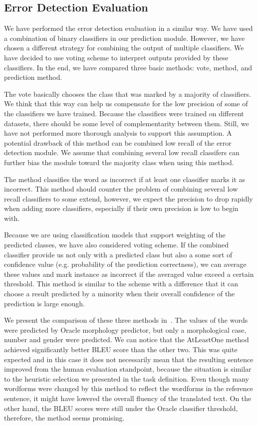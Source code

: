 \subsection{Error Detection Evaluation}

We have performed the error detection evaluation in a similar way. We have used a combination
of binary classifiers in our prediction module. However, we have chosen a different strategy
for combining the output of multiple classifiers.
We have decided to use voting scheme to interpret outputs provided by these classifiers.
In the end, we have compared three basic methods:  vote,  method,
and  prediction method.

The  vote basically chooses the class that was marked by a majority of classifiers.
We think that this way can help us compensate for the low precision of some of the classifiers we have trained.
Because the classifiers were trained on different datasets, there should be some level of complementarity
between them. Still, we have not performed more thorough analysis to support this assumption.
A potential drawback of this method can be combined low recall of the error detection module. We assume that
combining several low recall classifers can further bias the module toward the majority class when using
this method.

The  method classifies the word as incorrect if at least one classifier marks it
as incorrect. This method should counter the problem of combining several low recall classifiers to some
extend, however, we expect the precision to drop rapidly when adding more classifiers, especially if their own
precision is low to begin with.

Because we are using classification models that support weighting of the predicted classes, we have
also considered  voting scheme. If the combined classifier provide us not only with
a predicted class but also a some sort of confidence value (e.g. probability of the prediction correctness),
we can average these values and mark instance as incorrect if the averaged value exceed a certain threshold.
This method is similar to the  scheme with a difference that it can choose a result
predicted by a minority when their overall confidence of the prediction is large enough.

We present the comparison of these three methods in~. The values of the 
words were predicted by Oracle morphology predictor, but only a morphological case, number and gender were predicted.
We can notice that the AtLeastOne method achieved
significantly better BLEU score than the other two. This was quite expected and in this case it does
not necessarily mean that the resulting sentence improved from the human evaluation standpoint, because
the situation is similar to the heuristic selection we presented in the task definition. Even though
many wordforms were changed by this method to reflect the wordforms in the reference sentence, it
might have lowered the overall fluency of the translated text. On the other hand, the BLEU scores were
still under the Oracle classifier threshold, therefore, the method seems promising.


